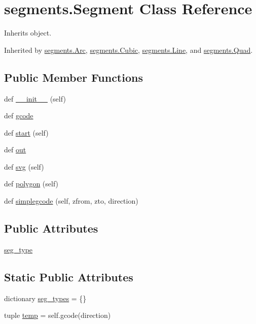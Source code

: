 \hypertarget{classsegments_1_1_segment}{}\section{segments.\+Segment Class Reference}
\label{classsegments_1_1_segment}


Inherits object.



Inherited by \hyperlink{classsegments_1_1_arc}{segments.\+Arc}, \hyperlink{classsegments_1_1_cubic}{segments.\+Cubic}, \hyperlink{classsegments_1_1_line}{segments.\+Line}, and \hyperlink{classsegments_1_1_quad}{segments.\+Quad}.

\subsection*{Public Member Functions}
\begin{DoxyCompactItemize}
\item 
def \hyperlink{classsegments_1_1_segment_a1361eaaf9eaa73cb73d9201808842108}{\+\_\+\+\_\+init\+\_\+\+\_\+} (self)
\item 
def \hyperlink{classsegments_1_1_segment_a22b1c733c65857a39bcedbc86654d4a0}{gcode}
\item 
def \hyperlink{classsegments_1_1_segment_a8b156fa2dcd4f93f6d781d820b931da4}{start} (self)
\item 
def \hyperlink{classsegments_1_1_segment_ad755cb568f5a00ba72459d41721a652e}{out}
\item 
def \hyperlink{classsegments_1_1_segment_a1b1ebb51664cb1aa198e6dd5a37520ba}{svg} (self)
\item 
def \hyperlink{classsegments_1_1_segment_ae8a07de4e87b72e7f915866647c577b8}{polygon} (self)
\item 
def \hyperlink{classsegments_1_1_segment_a7a8dd4167be305d3adbc27ffa3a41ff1}{simplegcode} (self, zfrom, zto, direction)
\end{DoxyCompactItemize}
\subsection*{Public Attributes}
\begin{DoxyCompactItemize}
\item 
\hyperlink{classsegments_1_1_segment_adcbfe80739fb05b3e68920b7139219e7}{seg\+\_\+type}
\end{DoxyCompactItemize}
\subsection*{Static Public Attributes}
\begin{DoxyCompactItemize}
\item 
dictionary \hyperlink{classsegments_1_1_segment_acaccd5af98d8073bdad79805908fefe4}{seg\+\_\+types} = \{\}
\item 
tuple \hyperlink{classsegments_1_1_segment_a4861399cabc87392517f539c38bb79d1}{temp} = self.\+gcode(direction)
\end{DoxyCompactItemize}


